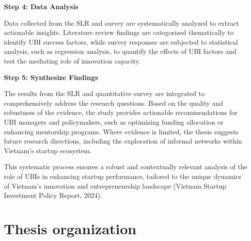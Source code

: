 \documentclass[../Main.tex]{subfiles}
\begin{document}
	\begin{center}
		\begin{minipage}[c]{\textwidth}
		\vspace*{\fill}

	\textbf{Step 4: Data Analysis}

	Data collected from the SLR and survey are systematically analyzed to extract actionable insights. Literature review findings are categorized thematically to identify UBI success factors, while survey responses are subjected to statistical analysis, such as regression analysis, to quantify the effects of UBI factors and test the mediating role of innovation capacity.

	\textbf{Step 5: Synthesize Findings}

	The results from the SLR and quantitative survey are integrated to comprehensively address the research questions. Based on the quality and robustness of the evidence, the study provides actionable recommendations for UBI managers and policymakers, such as optimizing funding allocation or enhancing mentorship programs. Where evidence is limited, the thesis suggests future research directions, including the exploration of informal networks within Vietnam's startup ecosystem.

	This systematic process ensures a robust and contextually relevant analysis of the role of UBIs in enhancing startup performance, tailored to the unique dynamics of Vietnam's innovation and entrepreneurship landscape (Vietnam Startup Investment Policy Report, 2024).

		\end{minipage}
	\end{center}

	\section{Thesis organization}
	\label{section:1.4_Thesis_organization} 
\end{document}
